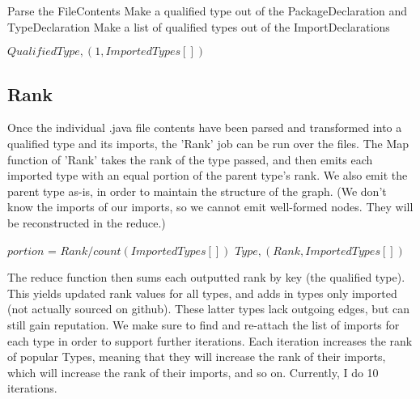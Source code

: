 \documentclass{article}
\begin{document}
\begin{algorithm}[H]
 \SetAlgoLined

\vspace{\baselineskip}

 Parse the FileContents\;
 Make a qualified type out of the PackageDeclaration and TypeDeclaration\;
 Make a list of qualified types out of the ImportDeclarations\;
\vspace{\baselineskip}

 \Emit $Qualified Type,(1,ImportedTypes[])$\;
\end{algorithm}

\subsection{Rank}
Once the individual .java file contents have been parsed and transformed into a qualified type and its imports, the 'Rank' job can be run over the files. The Map function of 'Rank' takes the rank of the type passed, and then emits each imported type with an equal portion of the parent type's rank. We also emit the parent type as-is, in order to maintain the structure of the graph. (We don't know the imports of our imports, so we cannot emit well-formed nodes. They will be reconstructed in the reduce.)

\vspace{\baselineskip}

\begin{algorithm}[H]
 \SetAlgoLined

\vspace{\baselineskip}
$portion$ = $Rank/count(ImportedTypes[])$\; 
\Emit $Type, (Rank, ImportedTypes[])$
 
\end{algorithm}

\vspace{\baselineskip}

 The reduce function then sums each outputted rank by key (the qualified type). This yields updated rank values for all types, and adds in types only imported (not actually sourced on github). These latter types lack outgoing edges, but can still gain reputation. We make sure to find and re-attach the list of imports for each type in order to support further iterations. Each iteration increases the rank of popular Types, meaning that they will increase the rank of their imports, which will increase the rank of their imports, and so on. Currently, I do 10 iterations.
\end{document}
